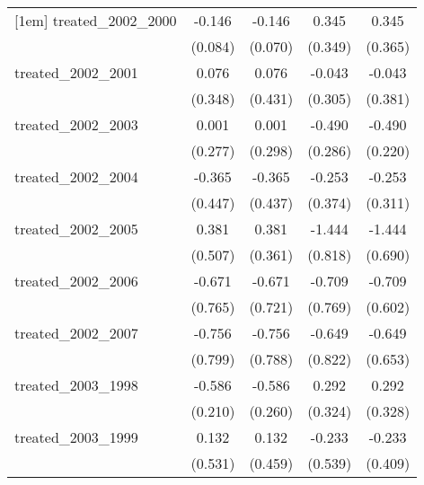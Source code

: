 {\begin{tabular}{l*{4}{c}}
[1em]
treated\_2002\_2000&      -0.146         &      -0.146\sym{*}  &       0.345         &       0.345         \\
            &     (0.084)         &     (0.070)         &     (0.349)         &     (0.365)         \\
[1em]
treated\_2002\_2001&       0.076         &       0.076         &      -0.043         &      -0.043         \\
            &     (0.348)         &     (0.431)         &     (0.305)         &     (0.381)         \\
[1em]
treated\_2002\_2003&       0.001         &       0.001         &      -0.490         &      -0.490\sym{*}  \\
            &     (0.277)         &     (0.298)         &     (0.286)         &     (0.220)         \\
[1em]
treated\_2002\_2004&      -0.365         &      -0.365         &      -0.253         &      -0.253         \\
            &     (0.447)         &     (0.437)         &     (0.374)         &     (0.311)         \\
[1em]
treated\_2002\_2005&       0.381         &       0.381         &      -1.444         &      -1.444\sym{*}  \\
            &     (0.507)         &     (0.361)         &     (0.818)         &     (0.690)         \\
[1em]
treated\_2002\_2006&      -0.671         &      -0.671         &      -0.709         &      -0.709         \\
            &     (0.765)         &     (0.721)         &     (0.769)         &     (0.602)         \\
[1em]
treated\_2002\_2007&      -0.756         &      -0.756         &      -0.649         &      -0.649         \\
            &     (0.799)         &     (0.788)         &     (0.822)         &     (0.653)         \\
[1em]
treated\_2003\_1998&      -0.586\sym{**} &      -0.586\sym{*}  &       0.292         &       0.292         \\
            &     (0.210)         &     (0.260)         &     (0.324)         &     (0.328)         \\
[1em]
treated\_2003\_1999&       0.132         &       0.132         &      -0.233         &      -0.233         \\
            &     (0.531)         &     (0.459)         &     (0.539)         &     (0.409)         \\

\end{tabular}}
